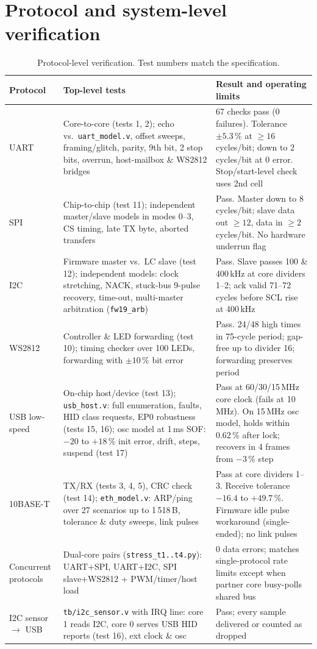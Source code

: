 \documentclass[10pt,a4paper]{article}
\begin{document}
\section{Protocol and system-level verification}\label{sec:protocols}

\begin{table}[H]
\centering\small
\begin{tabularx}{\linewidth}{@{}lLL@{}}
\toprule
Protocol & Top-level tests & Result and operating limits \\
\midrule
UART & Core-to-core (tests 1, 2); echo vs.\ \texttt{uart\_model.v}, offset sweeps, framing/glitch, parity, 9th bit, 2 stop bits, overrun, host-mailbox \& WS2812 bridges & 67 checks pass (0 failures). Tolerance $\pm 5.3\,\%$ at $\ge 16$ cycles/bit; down to 2 cycles/bit at 0 error. Stop/start-level check uses 2nd cell \\
SPI & Chip-to-chip (test 11); independent master/slave models in modes 0--3, CS timing, late TX byte, aborted transfers & Pass. Master down to 8 cycles/bit; slave data out $\ge 12$, data in $\ge 2$ cycles/bit. No hardware underrun flag \\
I2C & Firmware master vs.\ LC slave (test 12); independent models: clock stretching, NACK, stuck-bus 9-pulse recovery, time-out, multi-master arbitration (\texttt{fw19\_arb}) & Pass. Slave passes 100 \& 400\,kHz at core dividers 1--2; ack valid 71--72 cycles before SCL rise at 400\,kHz \\
WS2812 & Controller \& LED forwarding (test 10); timing checker over 100 LEDs, forwarding with $\pm 10\,\%$ bit error & Pass. 24/48 high times in 75-cycle period; gap-free up to divider 16; forwarding preserves period \\
USB low-speed & On-chip host/device (test 13); \texttt{usb\_host.v}: full enumeration, faults, HID class requests, EP0 robustness (tests 15, 16); osc model at 1\,ms SOF: $-20$ to $+18\,\%$ init error, drift, steps, suspend (test 17) & Pass at 60/30/15\,MHz core clock (fails at 10\,MHz). On 15\,MHz osc model, holds within 0.62\,\% after lock; recovers in 4 frames from $-3\,\%$ step \\
10BASE-T & TX/RX (tests 3, 4, 5), CRC check (test 14); \texttt{eth\_model.v}: ARP/ping over 27 scenarios up to 1\,518\,B, tolerance \& duty sweeps, link pulses & Pass at core dividers 1--3. Receive tolerance $-16.4$ to $+49.7\,\%$. Firmware idle pulse workaround (single-ended); no link pulses \\
Concurrent protocols & Dual-core pairs (\texttt{stress\_t1..t4.py}): UART+SPI, UART+I2C, SPI slave+WS2812 + PWM/timer/host load & 0 data errors; matches single-protocol rate limits except when partner core busy-polls shared bus \\
I2C sensor $\to$ USB & \texttt{tb/i2c\_sensor.v} with IRQ line: core 1 reads I2C, core 0 serves USB HID reports (test 16), ext clock \& osc & Pass; every sample delivered or counted as dropped \\
\bottomrule
\end{tabularx}
\caption{Protocol-level verification. Test numbers match the specification.}
\end{table}
\end{document}
